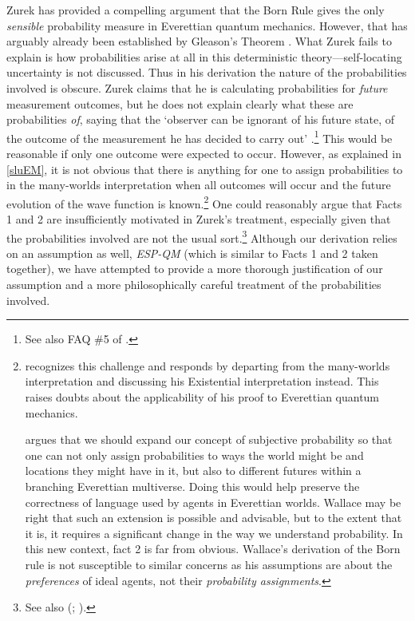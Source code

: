 \documentclass[onecolumn,secnumarabic,amsmath,amssymb,balancelastpage,nofootinbib]{article}
\begin{document}
Zurek has provided a compelling argument that the Born Rule gives the only \emph{sensible} probability measure in Everettian quantum mechanics. However, that has arguably already been established by Gleason's Theorem \citep{gleason}.  What Zurek fails to explain is how probabilities arise at all in this deterministic theory---self-locating uncertainty is not discussed.  Thus in his derivation the nature of the probabilities involved is obscure.  Zurek claims that he is calculating probabilities for \textit{future} measurement outcomes, but he does not explain clearly what these are probabilities \textit{of}, saying that the `observer can be ignorant of his future state, of the outcome of the measurement he has decided to carry out' \citep[][\textsection VII.C]{zurek2005}.\footnote{See also FAQ \#5 of \citep{zurek2010}.}  This would be reasonable if only one outcome were expected to occur.  However, as explained in \textsection \ref{sluEM}, it is not obvious that there is anything for one to assign probabilities to in the many-worlds interpretation when all outcomes will occur and the future evolution of the wave function is known.\footnote{\citet[\textsection III.C]{zurek2005} recognizes this challenge and responds by departing from the many-worlds interpretation and discussing his Existential interpretation instead.  This raises doubts about the applicability of his proof to Everettian quantum mechanics.

\citet[ch. 7, esp. ]{wallace2012} argues that we should expand our concept of subjective probability so that one can not only assign probabilities to ways the world might be and locations they might have in it, but also to different futures within a branching Everettian multiverse.  Doing this would help preserve the correctness of language used by agents in Everettian worlds.  Wallace may be right that such an extension is possible and advisable, but to the extent that it is, it requires a significant change in the way we understand probability.  In this new context, fact 2 is far from obvious.  Wallace's derivation of the Born rule is not susceptible to similar concerns as his assumptions are about the \emph{preferences} of ideal agents, not their \emph{probability assignments}.}  One could reasonably argue that Facts 1 and 2 are insufficiently motivated in Zurek's treatment, especially given that the probabilities involved are not the usual sort.\footnote{See also (\citealp[esp. \textsection III.F2]{schlosshauer2005}; \citealp[]{albert2010}).}  Although our {derivation} relies on an assumption as well, {\emph{ESP-QM}} (which is similar to Facts 1 and 2 taken together), we have attempted to provide a more thorough justification of our assumption and a more philosophically careful treatment of the probabilities involved.
\end{document}

